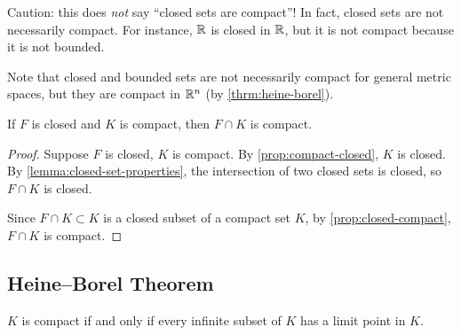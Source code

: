 \begin{remark}
Caution: this does \emph{not} say ``closed sets are compact''! In fact, closed sets are not necessarily compact. For instance, $\mathbb R$ is closed in $\mathbb R$, but it is not compact because it is not bounded.

Note that closed and bounded sets are not necessarily compact for general metric spaces, but they are compact in $\mathbb R^n$ (by \ref{thrm:heine-borel}).
\end{remark}

\begin{corollary}
If $F$ is closed and $K$ is compact, then $F\cap K$ is compact.
\end{corollary}

\begin{proof}
Suppose $F$ is closed, $K$ is compact. By \ref{prop:compact-closed}, $K$ is closed. By \ref{lemma:closed-set-properties}, the intersection of two closed sets is closed, so $F\cap K$ is closed.

Since $F\cap K\subset K$ is a closed subset of a compact set $K$, by \ref{prop:closed-compact}, $F\cap K$ is compact.
\end{proof}
\pagebreak

\subsection{Heine--Borel Theorem}
\begin{proposition}\label{prop:infinite-compact-lp}
$K$ is compact if and only if every infinite subset of $K$ has a limit point in $K$.
\end{proposition}

